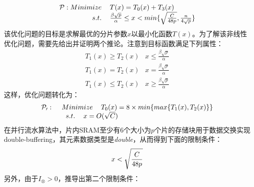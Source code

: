 \begin{flushleft}
\begin{equation}
\begin{array}{ll}
\mathcal{P}:Minimize\hspace*{1pc}T(x)=T_{0}(x)+T_{3}(x) \\
\hspace*{4pc} s.t. \hspace*{1pc}\frac{\beta\sqrt{p}}{\alpha}\le x<min\{\sqrt{\frac{C}{48p}},\frac{n}{4\sqrt{p}}\}
\end{array}
\end{equation}
该优化问题的目标是求解最优的分片参数$x$以最小化函数$T(x)$。为了解该非线性优化问题，需要先给出并证明两个推论。注意到目标函数满足下列属性：
\begin{displaymath}
\begin{array}{ll}
T_{1}(x) \ge T_{2}(x) & \textrm{$x\le\frac{\beta\sqrt{p}}{\alpha}$}
\end{array}
\end{displaymath}
\begin{displaymath}
\begin{array}{ll}
T_{1}(x) = T_{2}(x) & \textrm{$x=\frac{\beta\sqrt{p}}{\alpha}$}
\end{array}
\end{displaymath}
\begin{displaymath}
\begin{array}{ll}
T_{1}(x) \le T_{2}(x) & \textrm{$x\ge\frac{\beta\sqrt{p}}{\alpha}$}
\end{array}
\end{displaymath}
这样，优化问题转化为：
\begin{equation}\label{eq:opt}
\begin{array}{ll}
\mathcal{P_{0}}:\hspace*{1pc}Minimize\hspace*{1pc}T_{0}(x) = 8\times min\{max\{T_{1}(x), T_{2}(x)\}\} \\
\hspace*{3pc}s.t.\hspace*{1pc}\textrm{$x=O(\sqrt{C})$}
\end{array}
\end{equation}
在并行流水算法中，片内SRAM至少有6个大小为$p$个片的存储块用于数据交换实现double-buffering，其元素数据类型是{\em double}，从而得到下面的限制条件：
\begin{equation}\label{eq:c1}
x < \sqrt{\frac{C}{48p}}
\vspace{-0.225cm}
\end{equation}
另外，由于$I_{\otimes}>0$，推导出第二个限制条件：
\begin{equation}\label{eq:c2}

\end{equation}
\end{flushleft}
